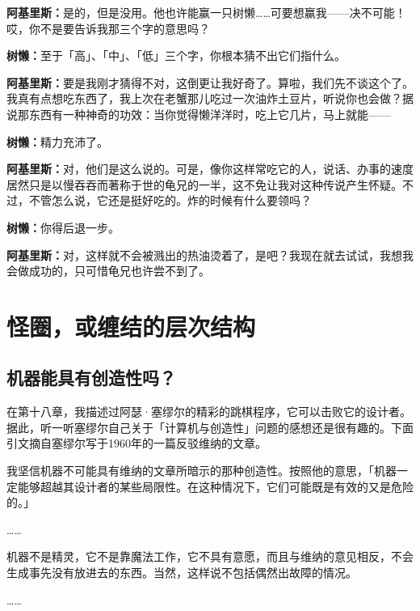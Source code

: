 \documentclass[
  12pt,
  twoside,
  openright,
  oldfontcommands,
]{memoir}
\newcommand{\dialogname}[1]{{\heifamily\bfseries #1}}
\newenvironment{fsquote}{%
  \begin{mdframed}[style=gebquote]\kaitifamily\small%
}{%
  \end{mdframed}%
}
\begin{document}
\dialogname{阿基里斯：}是的，但是没用。他也许能赢一只树懒\ldots\ldots 可要想赢我------决不可能！哎，你不是要告诉我那三个字的意思吗？

\dialogname{树懒：}至于「高」、「中」、「低」三个字，你根本猜不出它们指什么。

\dialogname{阿基里斯：}要是我刚才猜得不对，这倒更让我好奇了。算啦，我们先不谈这个了。我真有点想吃东西了，我上次在老蟹那儿吃过一次油炸土豆片，听说你也会做？据说那东西有一种神奇的功效：当你觉得懒洋洋时，吃上它几片，马上就能------

\dialogname{树懒：}精力充沛了。

\dialogname{阿基里斯：}对，他们是这么说的。可是，像你这样常吃它的人，说话、办事的速度居然只是以慢吞吞而著称于世的龟兄的一半，这不免让我对这种传说产生怀疑。不过，不管怎么说，它还是挺好吃的。炸的时候有什么要领吗？

\dialogname{树懒：}你得后退一步。

\dialogname{阿基里斯：}对，这样就不会被溅出的热油烫着了，是吧？我现在就去试试，我想我会做成功的，只可惜龟兄也许尝不到了。

\label{Chapter20.xhtml}{}

\chapter{怪圈，或缠结的层次结构}

\section{机器能具有创造性吗？}

在第十八章，我描述过阿瑟·塞缪尔的精彩的跳棋程序，它可以击败它的设计者。据此，听一听塞缪尔自己关于「计算机与创造性」问题的感想还是很有趣的。下面引文摘自塞缪尔写于1960年的一篇反驳维纳的文章。

\begin{fsquote}
我坚信机器不可能具有维纳的文章所暗示的那种创造性。按照他的意思，「机器一定能够超越其设计者的某些局限性。在这种情况下，它们可能既是有效的又是危险的。」
\end{fsquote}

\ldots\ldots{}

\begin{fsquote}
机器不是精灵，它不是靠魔法工作，它不具有意愿，而且与维纳的意见相反，不会生成事先没有放进去的东西。当然，这样说不包括偶然出故障的情况。
\end{fsquote}

\ldots\ldots{}
\end{document}
